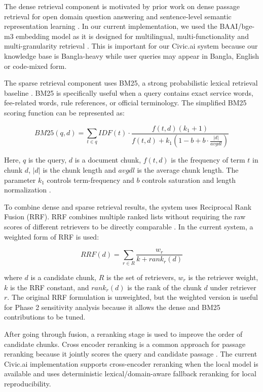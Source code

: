 The dense retrieval component is motivated by prior work on dense passage retrieval for open domain question answering \cite{karpukhin2020dpr} and sentence-level semantic representation learning \cite{reimers2019sbert}. In our current implementation, we used the BAAI/bge-m3 embedding model as it is designed for multilingual, multi-functionality and multi-granularity retrieval \cite{chen2024bgem3}. This is important for our Civic.ai system because our knowledge base is Bangla-heavy while user queries may appear in Bangla, English or code-mixed form.

The sparse retrieval component uses BM25, a strong probabilistic lexical retrieval baseline \cite{robertson2009bm25}. BM25 is specifically useful when a query contains exact service words, fee-related words, rule references, or official terminology. The simplified BM25 scoring function can be represented as:

\begin{equation}
BM25(q,d)=\sum_{t \in q} IDF(t)\cdot
\frac{f(t,d)(k_1+1)}
{f(t,d)+k_1(1-b+b\cdot\frac{|d|}{avgdl})}
\end{equation}

Here, $q$ is the query, $d$ is a document chunk, $f(t,d)$ is the frequency of term $t$ in chunk $d$, $|d|$ is the chunk length and $avgdl$ is the average chunk length. The parameter $k_1$ controls term-frequency and $b$ controls saturation and length normalization \cite{robertson2009bm25}.

To combine dense and sparse retrieval results, the system uses Reciprocal Rank Fusion (RRF). RRF combines multiple ranked lists without requiring the raw scores of different retrievers to be directly comparable \cite{cormack2009rrf}. In the current system, a weighted form of RRF is used:

\begin{equation}
RRF(d)=\sum_{r \in R}\frac{w_r}{k+rank_r(d)}
\end{equation}

where $d$ is a candidate chunk, $R$ is the set of retrievers, $w_r$ is the retriever weight, $k$ is the RRF constant, and $rank_r(d)$ is the rank of the chunk $d$ under retriever $r$. The original RRF formulation is unweighted, but the weighted version is useful for Phase 2 sensitivity analysis because it allows the dense and BM25 contributions to be tuned.

After going through fusion, a reranking stage is used to improve the order of candidate chunks. Cross encoder reranking is a common approach for passage reranking because it jointly scores the query and candidate passage \cite{nogueira2019passagebert}. The current Civic.ai implementation supports cross-encoder reranking when the local model is available and uses deterministic lexical/domain-aware fallback reranking for local reproducibility.

